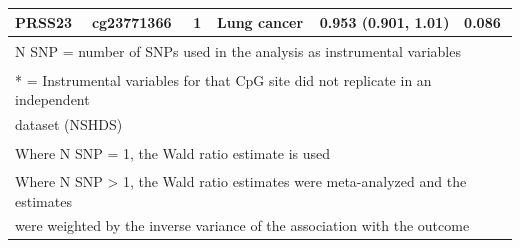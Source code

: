 \documentclass[11pt,twoside]{bristolthesis}
\begin{document}
\begin{table}[!h]
{\begin{tabular}[t]{llllll}
PRSS23 & cg23771366 & 1 & Lung cancer & 0.953 (0.901, 1.01) & 0.086\\
\bottomrule
\multicolumn{6}{l}{\textsuperscript{} N SNP = number of SNPs used in the analysis as instrumental variables}\\
\multicolumn{6}{l}{\textsuperscript{} * = Instrumental variables for that CpG site did not replicate in an independent}\\
\multicolumn{6}{l}{dataset (NSHDS)}\\
\multicolumn{6}{l}{\textsuperscript{} Where N SNP = 1, the Wald ratio estimate is used}\\
\multicolumn{6}{l}{\textsuperscript{} Where N SNP > 1, the Wald ratio estimates were meta-analyzed and the estimates}\\
\multicolumn{6}{l}{were weighted by the inverse variance of the association with the outcome}\\
\end{tabular}}
\end{table}
\end{document}
